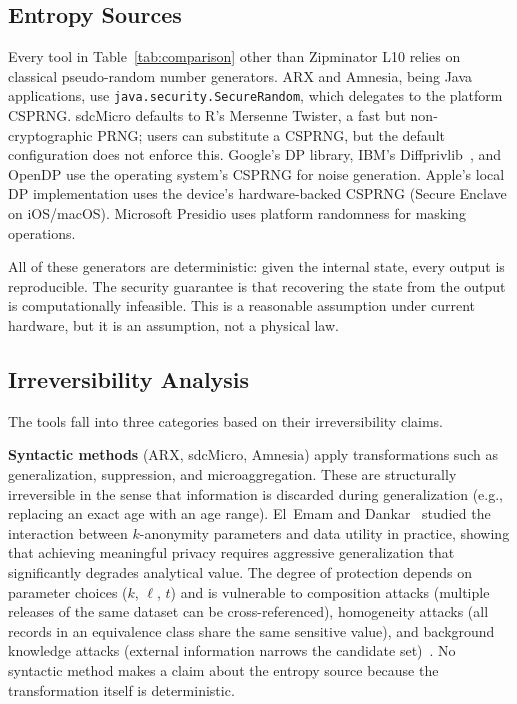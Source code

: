 \documentclass[journal]{IEEEtran}
\begin{document}
\subsection{Entropy Sources}
\label{subsec:entropy_sources}

Every tool in Table~\ref{tab:comparison} other than Zipminator L10 relies on classical pseudo-random number generators. ARX and Amnesia, being Java applications, use \texttt{java.security.\allowbreak SecureRandom}, which delegates to the platform CSPRNG. sdcMicro defaults to R's Mersenne Twister, a fast but non-cryptographic PRNG; users can substitute a CSPRNG, but the default configuration does not enforce this. Google's DP library, IBM's Diffprivlib~\cite{holohan2019diffprivlib}, and OpenDP use the operating system's CSPRNG for noise generation. Apple's local DP implementation uses the device's hardware-backed CSPRNG (Secure Enclave on iOS/macOS). Microsoft Presidio uses platform randomness for masking operations.

All of these generators are deterministic: given the internal state, every output is reproducible. The security guarantee is that recovering the state from the output is computationally infeasible. This is a reasonable assumption under current hardware, but it is an assumption, not a physical law.

\subsection{Irreversibility Analysis}
\label{subsec:irrev_analysis}

The tools fall into three categories based on their irreversibility claims.

\textbf{Syntactic methods} (ARX, sdcMicro, Amnesia) apply transformations such as generalization, suppression, and microaggregation. These are structurally irreversible in the sense that information is discarded during generalization (e.g., replacing an exact age with an age range). El~Emam and Dankar~\cite{elemam2008kanon} studied the interaction between $k$-anonymity parameters and data utility in practice, showing that achieving meaningful privacy requires aggressive generalization that significantly degrades analytical value. The degree of protection depends on parameter choices ($k$, $\ell$, $t$) and is vulnerable to composition attacks (multiple releases of the same dataset can be cross-referenced), homogeneity attacks (all records in an equivalence class share the same sensitive value), and background knowledge attacks (external information narrows the candidate set)~\cite{machanavajjhala2007ldiv, li2007tcloseness}. No syntactic method makes a claim about the entropy source because the transformation itself is deterministic.
\end{document}

